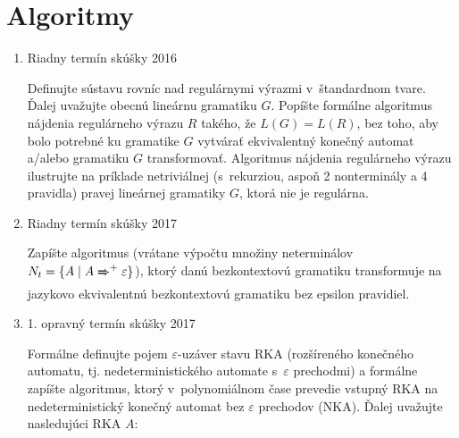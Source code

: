 \documentclass[]{article}
\begin{document}
	\section{Algoritmy}
	
	\begin{enumerate}
		\item Riadny termín skúšky 2016
		
		Definujte sústavu rovníc nad regulárnymi výrazmi v~štandardnom tvare. Ďalej uvažujte obecnú lineárnu gramatiku $G$. Popíšte formálne algoritmus nájdenia regulárneho výrazu $R$ takého, že $L(G) = L(R)$, bez toho, aby bolo potrebné ku gramatike $G$ vytvárať ekvivalentný konečný automat a/alebo gramatiku $G$ transformovať. Algoritmus nájdenia regulárneho výrazu ilustrujte na príklade netriviálnej (s~rekurziou, aspoň 2 nonterminály a 4 pravidla) pravej lineárnej gramatiky $G$, ktorá nie je regulárna.
		
		\item Riadny termín skúšky 2017
		
		Zapíšte algoritmus (vrátane výpočtu množiny neterminálov $N_t = \{ A \mid A \xRightarrow{}^+ \varepsilon\}$), ktorý danú bezkontextovú gramatiku transformuje na jazykovo ekvivalentnú bezkontextovú gramatiku bez epsilon pravidiel.
		
		\item 1. opravný termín skúšky 2017
		
		Formálne definujte pojem $\varepsilon$-uzáver stavu RKA (rozšíreného konečného automatu, tj. nedeterministického automate s~$\varepsilon$ prechodmi) a formálne zapíšte algoritmus, ktorý v~polynomiálnom čase prevedie vstupný RKA na nedeterministický konečný automat bez $\varepsilon$ prechodov (NKA). Ďalej uvažujte nasledujúci RKA $A$:
		

\end{enumerate}
\end{document}
